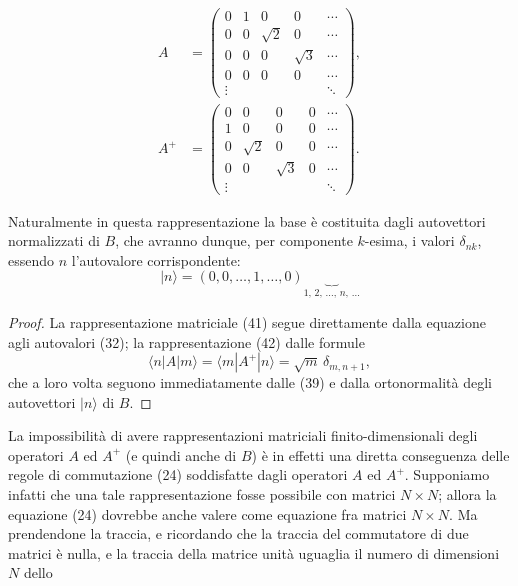 \documentclass[11pt, a4paper]{book}
\numberwithin{equation}{section}
\begin{document}

\begin{align}
A &=
\begin{pmatrix}
0      & 1      & 0       & 0       & \cdots \\
0      & 0      & \sqrt{2}& 0       & \cdots \\
0      & 0      & 0       & \sqrt{3}& \cdots \\
0      & 0      & 0       & 0       & \cdots \\
\vdots &        &         &         & \ddots
\end{pmatrix}, \tag{42a} \\[6pt]
A^+ &=
\begin{pmatrix}
0      & 0      & 0       & 0       & \cdots \\
1      & 0      & 0       & 0       & \cdots \\
0      & \sqrt{2}& 0      & 0       & \cdots \\
0      & 0      & \sqrt{3}& 0       & \cdots \\
\vdots &        &         &         & \ddots
\end{pmatrix}. \tag{42b}
\end{align}

Naturalmente in questa rappresentazione la base è costituita dagli
autovettori normalizzati di $B$, che avranno dunque, per componente
$k$-esima, i valori $\delta_{nk}$, essendo $n$ l'autovalore
corrispondente:
\[
|n\rangle = (0, 0, \ldots, 1, \ldots, 0)
            \underbrace{\quad}_{1,\,2,\,\ldots,\,n,\,\ldots}
\]

\begin{proof}
La rappresentazione matriciale (41) segue direttamente dalla equazione
agli autovalori (32); la rappresentazione (42) dalle formule
\[
\langle n|A|m\rangle = \langle m|A^+|n\rangle = \sqrt{m}\,\delta_{m,n+1},
\]
che a loro volta seguono immediatamente dalle (39) e dalla ortonormalità
degli autovettori $|n\rangle$ di $B$.
\end{proof}

La impossibilità di avere rappresentazioni matriciali finito-dimensionali
degli operatori $A$ ed $A^+$ (e quindi anche di $B$) è in effetti una
diretta conseguenza delle regole di commutazione (24) soddisfatte dagli
operatori $A$ ed $A^+$. Supponiamo infatti che una tale rappresentazione
fosse possibile con matrici $N \times N$; allora la equazione (24)
dovrebbe anche valere come equazione fra matrici $N \times N$. Ma
prendendone la traccia, e ricordando che la traccia del commutatore di due
matrici è nulla, e la traccia della matrice unità uguaglia il numero di
dimensioni $N$ dello
\end{document}
